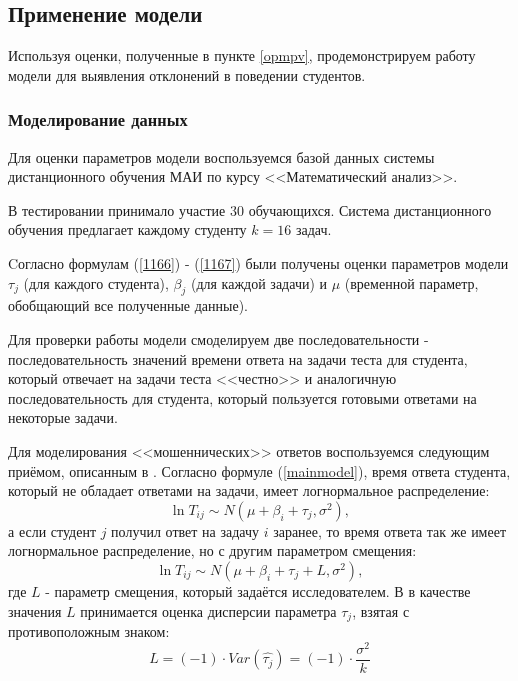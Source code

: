 \subsection{Применение модели}

Используя оценки, полученные в пункте \ref{opmpv}, продемонстрируем работу модели для выявления отклонений в поведении студентов.

\subsubsection{Моделирование данных}

Для оценки параметров модели воспользуемся базой данных системы дис\-танционного обучения МАИ по курсу <<Математический анализ>>.

В тестировании принимало участие $30$ обучающихся. Система дистанционного обучения предлагает каждому студенту $k=16$ задач.


Cогласно формулам (\ref{1166}) - (\ref{1167}) были получены оценки параметров модели $\tau_j$ (для каждого студента), $\beta_j$ (для каждой задачи) и $\mu$ (временной параметр, обобщающий все полученные данные).

Для проверки работы модели смоделируем две последовательности - после\-довательность значений времени ответа на задачи теста для студента, который отвечает на задачи теста <<честно>> и аналогичную последовательность для студента, который пользуется готовыми ответами на некоторые задачи.

Для моделирования <<мошеннических>> ответов воспользуемся следующим приёмом, описанным в \cite{6.}. Согласно формуле (\ref{mainmodel}), время ответа студента, который не обладает ответами на задачи, имеет логнормальное распределение:
$$
\ln T_{ij} \sim N (\mu + \beta_i + \tau_j, \sigma^2),
$$
а если студент $j$ получил ответ на задачу $i$ заранее, то время ответа так же имеет логнормальное распределение, но с другим параметром смещения:
$$
\ln T_{ij} \sim N (\mu + \beta_i + \tau_j + L, \sigma^2),
$$
где $L$ - параметр смещения, который задаётся исследователем. В \cite{6.} в качестве значения $L$ принимается оценка дисперсии параметра $\tau_j$, взятая с противо\-положным знаком:
\begin{equation}
\label{fraudlevel}
L = (-1)\cdot Var\left( \hat{\tau_j}\right) = (-1)\cdot \frac{\sigma^2}{k}
\end{equation}

